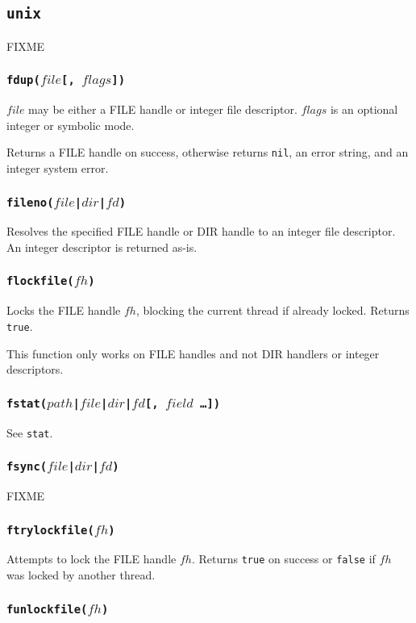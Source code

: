 \documentclass[11pt, oneside]{memoir}
\newcommand*{\true}[0]{\texttt{true}\xspace}
\newcommand*{\false}[0]{\texttt{false}\xspace}
\newcommand*{\nil}[0]{\texttt{nil}\xspace}
\newcommand*{\fn}[1]{\texttt{#1}\xspace}
\newcounter{toccols}
\newenvironment{Module}[1]{
	\subsection{\texttt{#1}}
	\addtocontents{toc}{
		\protect\begin{multicols}{\value{toccols}}
	}
}{
	\addtocontents{toc}{\protect\end{multicols}}
}
\begin{document}
\begin{Module}{unix}
FIXME

\subsubsection[\fn{fdup}]{\fn{fdup($file$[, $flags$])}}

$file$ may be either a FILE handle or integer file descriptor. $flags$ is an optional integer or symbolic mode.

Returns a FILE handle on success, otherwise returns \nil, an error string, and an integer system error.

\subsubsection[\fn{fileno}]{\fn{fileno($file$|$dir$|$fd$)}}

Resolves the specified FILE handle or DIR handle to an integer file descriptor. An integer descriptor is returned as-is.

\subsubsection[\fn{flockfile}]{\fn{flockfile($fh$)}}

Locks the FILE handle $fh$, blocking the current thread if already locked. Returns \true.

This function only works on FILE handles and not DIR handlers or integer descriptors.

\subsubsection[\fn{fstat}]{\fn{fstat($path$|$file$|$dir$|$fd$[, $field$ \ldots])}}

See \fn{stat}.

\subsubsection[\fn{fsync}]{\fn{fsync($file$|$dir$|$fd$)}}

FIXME

\subsubsection[\fn{ftrylockfile}]{\fn{ftrylockfile($fh$)}}

Attempts to lock the FILE handle $fh$. Returns \true on success or \false if $fh$ was locked by another thread.

\subsubsection[\fn{funlockfile}]{\fn{funlockfile($fh$)}}


\end{Module}
\end{document}
